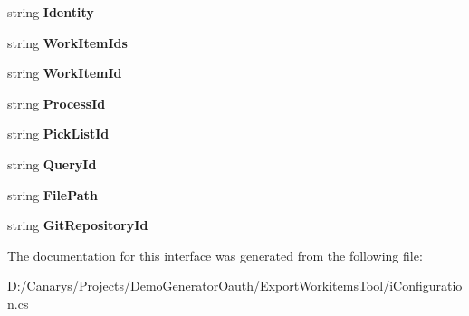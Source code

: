 \begin{DoxyCompactItemize}
string {\bfseries Identity}
\item 
\mbox{\label{interface_templates_generator_tool_1_1_i_configuration_a79fd3ac49032caa02a9a0895c8ee34c6}} 
string {\bfseries Work\+Item\+Ids}
\item 
\mbox{\label{interface_templates_generator_tool_1_1_i_configuration_afa686bcb50d8ea923a4381f12c75142e}} 
string {\bfseries Work\+Item\+Id}
\item 
\mbox{\label{interface_templates_generator_tool_1_1_i_configuration_af17260e0422f922ec02e357203a6fc25}} 
string {\bfseries Process\+Id}
\item 
\mbox{\label{interface_templates_generator_tool_1_1_i_configuration_a9de86c96af44ef9df21aa16a84f6cfa1}} 
string {\bfseries Pick\+List\+Id}
\item 
\mbox{\label{interface_templates_generator_tool_1_1_i_configuration_a89cb953a87d44a00e019290ca8e6c7c6}} 
string {\bfseries Query\+Id}
\item 
\mbox{\label{interface_templates_generator_tool_1_1_i_configuration_ad04fd3e0455db5e3733014dd399d0a20}} 
string {\bfseries File\+Path}
\item 
\mbox{\label{interface_templates_generator_tool_1_1_i_configuration_af7f4e736f61aa4ead2dbfd6fc4ba9ba6}} 
string {\bfseries Git\+Repository\+Id}
\end{DoxyCompactItemize}


The documentation for this interface was generated from the following file\+:\begin{DoxyCompactItemize}
\item 
D\+:/\+Canarys/\+Projects/\+Demo\+Generator\+Oauth/\+Export\+Workitems\+Tool/i\+Configuration.\+cs\end{DoxyCompactItemize}
